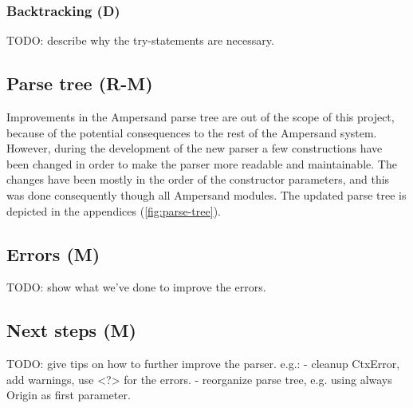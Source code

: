 \subsubsection{Backtracking (D)}
\label{subsec:backtracking}
TODO: describe why the try-statements are necessary.

\subsection{Parse tree (R-M)}
\label{subsec:design-parse-tree}
Improvements in the Ampersand parse tree are out of the scope of this project, because of the potential consequences to the rest of the Ampersand system.
However, during the development of the new parser a few constructions have been changed in order to make the parser more readable and maintainable.
The changes have been mostly in the order of the constructor parameters, and this was done consequently though all Ampersand modules.
The updated parse tree is depicted in the appendices (\autoref{fig:parse-tree}).

\subsection{Errors (M)}
\label{subsec:design-errors}
TODO: show what we've done to improve the errors.

\subsection{Next steps (M)}
\label{subsec:design-next-steps}
TODO: give tips on how to further improve the parser. e.g.:
  - cleanup CtxError, add warnings, use <?> for the errors.
  - reorganize parse tree, e.g. using always Origin as first parameter.